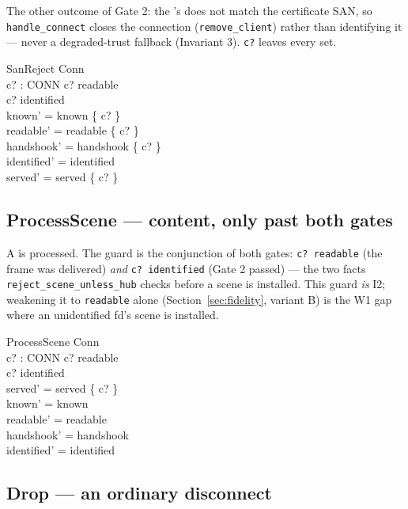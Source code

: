 \documentclass[a4paper,10pt,fleqn]{article}
\begin{document}
The other outcome of Gate 2: the 's 
does not match the certificate SAN, so \texttt{handle\_connect} closes the
connection (\texttt{remove\_client}) rather than identifying it --- never a
degraded-trust fallback (Invariant 3).  \texttt{c?} leaves every set.

\begin{schema}{SanReject}
  \Delta Conn \\
  c? : CONN
\where
  c? \in readable \\
  c? \notin identified \\
  known' = known \setminus \{ c? \} \\
  readable' = readable \setminus \{ c? \} \\
  handshook' = handshook \setminus \{ c? \} \\
  identified' = identified \\
  served' = served \setminus \{ c? \}
\end{schema}

\subsection{ProcessScene --- content, only past both gates}

A  is processed.  The guard is the conjunction of both
gates: \texttt{c? \in readable} (the frame was delivered) \emph{and}
\texttt{c? \in identified} (Gate 2 passed) --- the two facts
\texttt{reject\_scene\_unless\_hub} checks before a scene is installed.
This guard \emph{is} I2; weakening it to \texttt{readable} alone
(Section~\ref{sec:fidelity}, variant B) is the W1 gap where an
unidentified fd's scene is installed.

\begin{schema}{ProcessScene}
  \Delta Conn \\
  c? : CONN
\where
  c? \in readable \\
  c? \in identified \\
  served' = served \cup \{ c? \} \\
  known' = known \\
  readable' = readable \\
  handshook' = handshook \\
  identified' = identified
\end{schema}

\subsection{Drop --- an ordinary disconnect}
\end{document}
